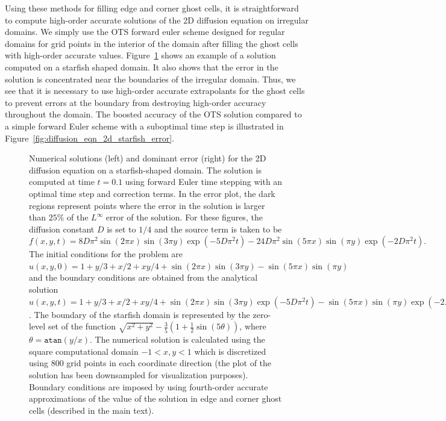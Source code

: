 \documentclass[oneeqnum,onefignum,onetabnum,onethmnum]{siamltex}
\begin{document}
Using these methods for filling edge and corner ghost cells, it is 
straightforward to compute high-order accurate solutions of the 2D diffusion 
equation on irregular domains.  We simply use the OTS forward euler scheme 
designed for regular domains for grid points in the interior of the domain
after filling the ghost cells with high-order accurate values.  
Figure~\ref{fig:diffusion_eqn_2d_starfish_domain} shows an example of 
a solution computed on a starfish shaped domain.  It also shows that the 
error in the solution is concentrated near the boundaries of the irregular
domain.  Thus, we see that it is necessary to use high-order accurate 
extrapolants for the ghost cells to prevent errors at the boundary from 
destroying high-order accuracy throughout the domain.  The boosted accuracy 
of the OTS solution compared to a simple forward Euler scheme with a 
suboptimal time step is illustrated in 
Figure~\ref{fig:diffusion_eqn_2d_starfish_error}. 

\begin{figure}[htb]
\begin{center}
\caption{Numerical solutions (left) and dominant error (right) for the 2D 
diffusion equation on a starfish-shaped domain.  The solution is computed at 
time $t = 0.1$ using forward Euler time stepping with an optimal time step 
and correction terms.  In the error plot, the dark regions represent points 
where the error in the solution is larger than $25$\% of the $L^\infty$ error 
of the solution.  For these figures, the diffusion constant $D$ is set to 
$1/4$ and the source term is taken to be 
$f(x,y,t) = 8 D \pi^2 \sin(2 \pi x) \sin(3 \pi y) 
            \exp\left(-5 D \pi^2 t\right)
          - 24 D \pi^2 \sin(5 \pi x) \sin(\pi y) 
            \exp \left(-2 D \pi^2 t \right).
$
The initial conditions for the problem are 
$u(x,y,0) = 1 + y/3 + x/2 + xy/4 
          + \sin(2 \pi x) \sin(3 \pi y) 
          - \sin(5 \pi x) \sin(\pi y)
$
and the boundary conditions are obtained from the analytical solution
$u(x,y,t) = 1 + y/3 + x/2 + xy/4 
              + \sin(2 \pi x) \sin(3 \pi y) \exp(-5 D \pi^2 t) 
              - \sin(5 \pi x) \sin(\pi y) \exp(-2 D \pi^2 t)
$.
The boundary of the starfish domain is represented by the zero-level set of 
the function
$\sqrt{x^2 + y^2} - \frac{3}{5} \left(1 + \frac{1}{2}\sin(5 \theta) \right)$, 
where $\theta = \mathtt{atan}\left( y/x \right)$.
The numerical solution is calculated using the square computational domain 
$-1 < x,y < 1$ which is discretized using 800 grid points in each coordinate 
direction (the plot of the solution has been downsampled for visualization 
purposes).  Boundary conditions are imposed by using fourth-order accurate
approximations of the value of the solution in edge and corner ghost cells
(described in the main text).
}
\label{fig:diffusion_eqn_2d_starfish_domain}
\end{center}
\end{figure}
\end{document}
